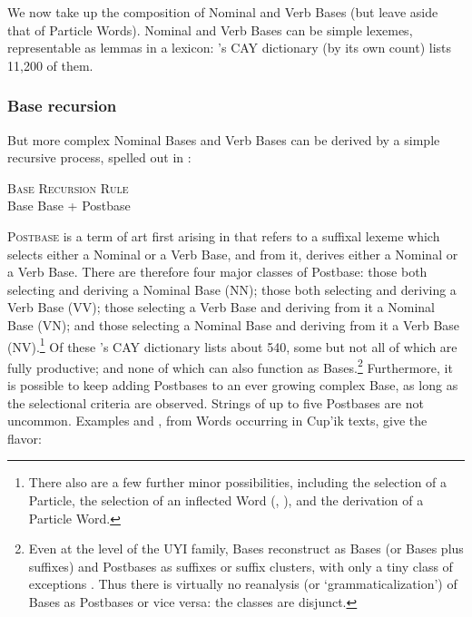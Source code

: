 \documentclass[output=paper]{langscibook}
\begin{document}
We now take up the composition of Nominal and Verb Bases (but leave aside that of Particle Words). Nominal and Verb Bases can be simple lexemes, representable as lemmas in a lexicon: \citet[12]{Jacobson2012}'s CAY dictionary (by its own count) lists 11,200 of them.

\subsubsection{Base recursion} \label{sec:3.2.1}

But more complex Nominal Bases and Verb Bases can be derived by a simple recursive process, spelled out in :

\ea\label{ex:key:8}
{\textsc{Base} \textsc{Recursion} \textsc{Rule}}\\
Base \MVRightarrow{} Base + Postbase
\z


\textsc{Postbase} is a term of art first arising in \citet{Reed1977} that refers to a suffixal lexeme which selects either a Nominal or a Verb Base, and from it, derives either a Nominal or a Verb Base. There are therefore four major classes of Postbase: those both selecting and deriving a Nominal Base (NN); those both selecting and deriving a Verb Base (VV); those selecting a Verb Base and deriving from it a Nominal Base (VN); and those selecting a Nominal Base and deriving from it a Verb Base (NV).\footnote{There also are a few further minor possibilities, including the selection of a Particle, the selection of an inflected Word (\citealt{Woodbury1996}, \citealt{Sadock2017}), and the derivation of a Particle Word.} Of these \citet{Jacobson2012}'s CAY dictionary lists about 540, some but not all of which are fully productive; and none of which can also function as Bases.\footnote{Even at the level of the UYI family, Bases reconstruct as Bases (or Bases plus suffixes) and Postbases as suffixes or suffix clusters, with only a tiny class of exceptions \citep{Fortescue2010}. Thus there is virtually no reanalysis (or `grammaticalization') of Bases as Postbases or vice versa: the classes are disjunct.} Furthermore, it is possible to keep adding Postbases to an ever growing complex Base, as long as the selectional criteria are observed. Strings of up to five Postbases are not uncommon. Examples  and , from Words occurring in Cup'ik texts, give the flavor:
\end{document}
